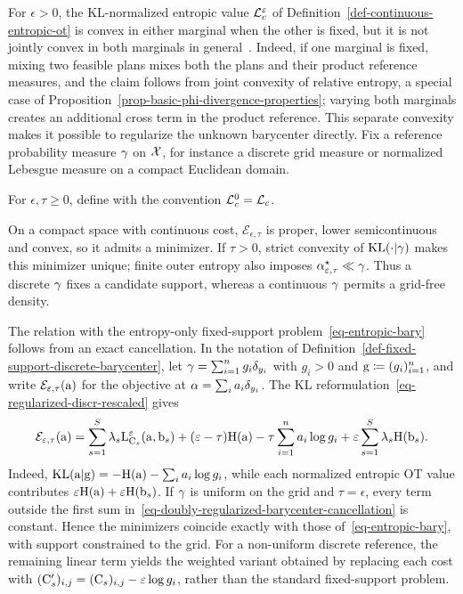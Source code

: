 For $\epsilon>0$, the KL-normalized entropic value $\mathcal{L}_c^\varepsilon$ of Definition~\ref{def-continuous-entropic-ot} is convex in either marginal when the other is fixed, but it is not jointly convex in both marginals in general~\cite{Chizat2025DoublyRegularizedBarycenter}. Indeed, if one marginal is fixed, mixing two feasible plans mixes both the plans and their product reference measures, and the claim follows from joint convexity of relative entropy, a special case of Proposition~\ref{prop-basic-phi-divergence-properties}; varying both marginals creates an additional cross term in the product reference. This separate convexity makes it possible to regularize the unknown barycenter directly. Fix a reference probability measure $\gamma$ on $\mathcal{X}$, for instance a discrete grid measure or normalized Lebesgue measure on a compact Euclidean domain.

\begin{defn}\label{def-doubly-regularized-entropic-barycenter}
For $\epsilon,\tau\geq0$, define
with the convention $\mathcal{L}_c^0=\mathcal{L}_c$.
\end{defn}

On a compact space with continuous cost, $\mathcal E_{\epsilon,\tau}$ is proper, lower semicontinuous and convex, so it admits a minimizer. If $\tau>0$, strict convexity of $\operatorname{KL}(\cdot|\gamma)$ makes this minimizer unique; finite outer entropy also imposes $\alpha_{\varepsilon,\tau}^\star\ll\gamma$. Thus a discrete $\gamma$ fixes a candidate support, whereas a continuous $\gamma$ permits a grid-free density.

The relation with the entropy-only fixed-support problem~\eqref{eq-entropic-bary} follows from an exact cancellation. In the notation of Definition~\ref{def-fixed-support-discrete-barycenter}, let $\gamma=\sum_{i=1}^n g_i\delta_{y_i}$ with $g_i>0$ and $\mathrm{g}\coloneqq(g_i)_{i=1}^n$, and write $\mathcal E_{\varepsilon,\tau}(\mathrm{a})$ for the objective at $\alpha=\sum_i a_i\delta_{y_i}$. The KL reformulation~\eqref{eq-regularized-discr-rescaled} gives
\begin{equation}\label{eq-doubly-regularized-barycenter-cancellation}
\mathcal E_{\varepsilon,\tau}(\mathrm{a})=\sum_{s=1}^S\lambda_s\mathrm{L}_{\mathrm{C}_s}^\varepsilon(\mathrm{a},\mathrm{b}_s)+(\varepsilon-\tau)\mathrm{H}(\mathrm{a})-\tau\sum_{i=1}^n a_i\log g_i+\varepsilon\sum_{s=1}^S\lambda_s\mathrm{H}(\mathrm{b}_s).
\end{equation}
Indeed, $\mathrm{KL}(\mathrm{a}|\mathrm{g})=-\mathrm{H}(\mathrm{a})-\sum_i a_i\log g_i$, while each normalized entropic OT value contributes $\varepsilon\mathrm{H}(\mathrm{a})+\varepsilon\mathrm{H}(\mathrm{b}_s)$. If $\gamma$ is uniform on the grid and $\tau=\epsilon$, every term outside the first sum in~\eqref{eq-doubly-regularized-barycenter-cancellation} is constant. Hence the minimizers coincide exactly with those of~\eqref{eq-entropic-bary}, with support constrained to the grid. For a non-uniform discrete reference, the remaining linear term yields the weighted variant obtained by replacing each cost with $(\mathrm{C}_s')_{i,j}=(\mathrm{C}_s)_{i,j}-\varepsilon\log g_i$, rather than the standard fixed-support problem.


